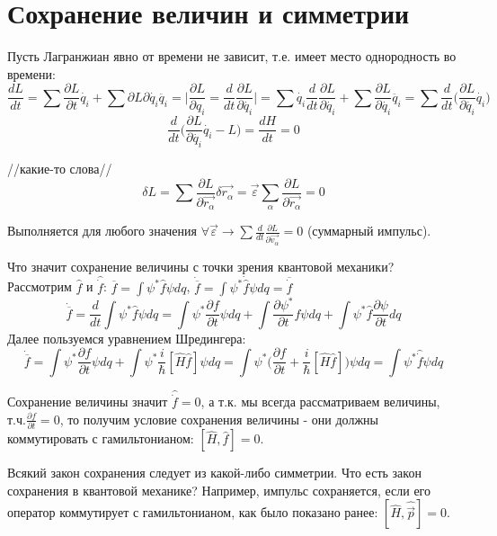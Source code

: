 \newpage
\chapter{Сохранение величин и симметрии}
\par Пусть Лагранжиан явно от времени не зависит, т.е. имеет место однородность во времени:
$$ \frac{dL}{dt}=\sum \frac{\partial L}{\partial t} \dot{q_i} + \sum {\partial L}{\partial \dot{q_i}} \ddot{q_i} = \bigg| \frac{\partial L}{\partial q_i} = \frac{d}{dt} \frac{\partial L}{\partial \dot{q_i}} \bigg| = \sum \dot{q_i}  \frac{d}{dt} \frac{\partial L}{\partial \dot{q_i}} + \sum \frac{\partial L}{\partial \dot{q_i}} \ddot{q_i} = \sum  \frac{d}{dt}  \bigg(\frac{\partial L}{\partial \dot{q_i}} \dot{q_i} \bigg)$$
$$\frac{d}{dt} \bigg(\frac{\partial L}{\partial \dot{q_i}} \dot{q_i} - L \bigg)= \frac{dH}{dt} =0 $$
\par //какие-то слова//
$$ \delta L = \sum \frac{\partial L}{\partial \vec{r_{\alpha}}} \delta \vec{r_{\alpha}} = \vec{\varepsilon} \sum_{\alpha} \frac{\partial L}{\partial \vec{r_{\alpha}}} =0 $$
\par Выполняется для любого значения $\forall \vec{\varepsilon} \longrightarrow \sum \frac{d}{dt} \frac{\partial L}{\partial \vec{v_{\alpha}}} =0 $ (суммарный импульс).
\par Что значит сохранение величины с точки зрения квантовой механики? Рассмотрим $\hat{f}$ и $\hat{\dot{f}}$:
$ \overline{f} = \int \psi^* \hat{f} \psi dq$, $ \dot{\overline{f}} = \int \psi^* \dot{\hat{f}} \psi dq = \overline{\dot{f}} $
$$ \dot{\overline{f}} =\frac{d}{dt} \int \psi^* \hat{f} \psi dq = \int \psi^* \frac{\partial f}{\partial t} \psi dq + \int \frac{\partial \psi^*}{\partial t} f \psi dq + \int \psi ^* \hat{f} \frac{\partial \psi}{\partial t} dq $$
Далее пользуемся уравнением Шредингера:
$$ \dot{\overline{f}}= \int \psi^* \frac{\partial f}{\partial t} \psi dq + \int \psi^* \frac{i}{\hbar} [\hat{H} \hat{f}] \psi dq = \int \psi^*\bigg(\frac{\partial f}{\partial t} +\frac{i}{\hbar}[\hat{H} \hat{f}] \bigg) \psi dq = \int \psi^* \hat{\dot{f}} \psi dq $$
\par Сохранение величины значит $ \hat{\dot{f}} =0$, а т.к. мы всегда рассматриваем величины, т.ч.$\frac{\partial f}{\partial t} = 0$, то получим условие сохранения величины - они должны коммутировать с гамильтонианом: $[\hat{H} {,} \hat{f}] =0 $.
\par Всякий закон сохранения следует из какой-либо симметрии. Что есть закон сохранения в квантовой механике? Например, импульс сохраняется, если его оператор коммутирует с гамильтонианом, как было показано ранее: $[\hat{H}{,} \hat{\vec{p}}] =0 $.
